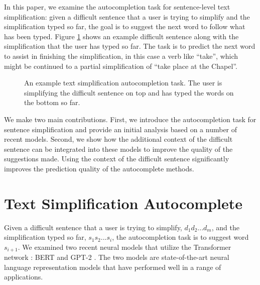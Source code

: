 \documentclass[11pt]{article}
\begin{document}
In this paper, we examine the autocompletion task for sentence-level text simplification: given a difficult sentence that a user is trying to simplify and the simplification typed so far, the goal is to suggest the next word to follow what has been typed.  Figure \ref{fig:example} shows an example difficult sentence along with the simplification that the user has typed so far.  The task is to predict the next word to assist in finishing the simplification, in this case a verb like ``take'', which might be continued to a partial simplification of ``take place at the Chapel''.

\begin{figure}
    \centering
    \caption{An example text simplification autocompletion task.  The user is simplifying the difficult sentence on top and has typed the words on the bottom so far.}
    \label{fig:example}
    \vspace{-0.15in}
\end{figure}

We make two main contributions.  First, we introduce the autocompletion task for sentence simplification and provide an initial analysis based on a number of recent models.  Second, we show how the additional context of the difficult sentence can be integrated into these models to improve the quality of the suggestions made.  Using the context of the difficult sentence significantly improves the prediction quality of the autocomplete methods.


\section{Text Simplification Autocomplete}

Given a difficult sentence that a user is trying to simplify, $d_1 d_2 ... d_m$, and the simplification typed so far, $s_1 s_2 ... s_i$, the autocompletion task is to suggest word $s_{i+1}$.   We examined two recent neural models that utilize the Transformer network \cite{vaswani2017attention}: BERT \cite{devlin2018bert} and GPT-2 \cite{radford2019language}.  The two models are state-of-the-art neural language representation models that have performed well in a range of applications.
\end{document}
